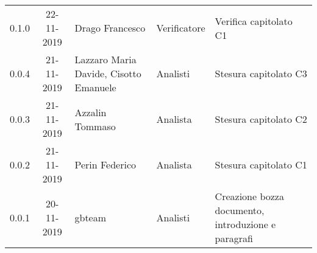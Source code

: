{\begin{longtable}{ c c  C{4cm}  C{3cm} C{4cm}}
0.1.0 & 22-11-2019 & Drago Francesco & Verificatore & Verifica capitolato C1 \\

0.0.4 & 21-11-2019 & Lazzaro Maria Davide, Cisotto Emanuele & Analisti & Stesura capitolato C3 \\

0.0.3 & 21-11-2019 & Azzalin Tommaso & Analista & Stesura capitolato C2  \\

0.0.2 & 21-11-2019 & Perin Federico & Analista & Stesura capitolato C1  \\
		
0.0.1 & 20-11-2019 & gbteam & Analisti & Creazione bozza documento, introduzione e paragrafi \\
		
\end{longtable}
}
